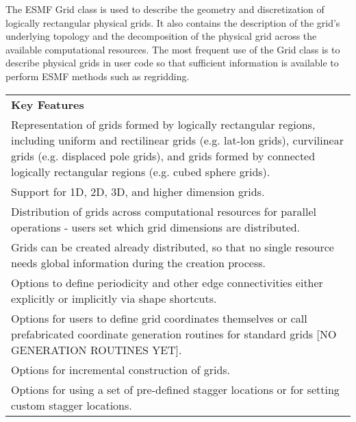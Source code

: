 %

The ESMF Grid class is used to describe the geometry and discretization
of logically rectangular physical grids.  It also contains the
description of the grid's underlying topology and the decomposition
of the physical grid across the available computational resources.
The most frequent use of the Grid class is to describe physical grids
in user code so that sufficient information is available to perform ESMF
methods such as regridding.  



\begin{center}
\begin{tabular}{|p{6in}|}
\hline
\vspace{.01in}
{\bf Key Features} \\[.01in]
Representation of grids formed by logically rectangular regions,
including uniform and rectilinear grids (e.g. lat-lon grids),
curvilinear grids (e.g. displaced pole grids), and grids formed
by connected logically rectangular regions (e.g. cubed sphere grids).\\
Support for 1D, 2D, 3D, and higher dimension grids.\\ 
Distribution of grids across computational resources for parallel
operations - users set which grid dimensions are distributed.\\
Grids can be created already distributed, so that no single
resource needs global information during the creation process.\\
Options to define periodicity and other edge connectivities either 
explicitly or implicitly via shape shortcuts.\\ 
Options for users to define grid coordinates themselves or call
prefabricated coordinate generation routines for standard grids
[NO GENERATION ROUTINES YET].\\
Options for incremental construction of grids.\\
Options for using a set of pre-defined stagger locations or for setting
custom stagger locations.\\ [.03in] \hline
\end{tabular}
\end{center}

